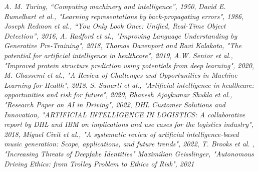 \documentclass{article}
\begin{document}
\begin{thebibliography}{9}
	 \emph{A. M. Turing, “Computing machinery and intelligence”, 1950}, 
	 \emph{David E. Rumelhart et al., "Learning representations by back-propagating errors", 1986},
	 \emph{Joseph Redmon et al., “You Only Look Once:
		Unified, Real-Time Object Detection”, 2016},
	 \emph{A. Radford et al., "Improving Language Understanding
		by Generative Pre-Training", 2018},
	 \emph{Thomas Davenport and Ravi Kalakota, "The potential for artificial intelligence in healthcare", 2019},
	 \emph{A.W. Senior et al., "Improved protein structure prediction using potentials from deep learning", 2020},
	 \emph{M. Ghassemi et al., "A Review of Challenges and Opportunities in Machine Learning for Health", 2018},
	 \emph{S. Sunarti et al., "Artificial intelligence in healthcare: opportunities and risk for future", 2020},
	 \emph{Bhavesh Ajaykumar Shukla et al., "Research Paper on AI in Driving", 2022},
	 \emph{DHL Customer Solutions and Innovation, "ARTIFICIAL INTELLIGENCE
		IN LOGISTICS: A collaborative report by DHL and IBM on implications
		and use cases for the logistics industry", 2018},
	 \emph{Miguel Civit et al., "A systematic review of artificial intelligence-based music generation: Scope, applications, and future trends", 2022},
	 \emph{T. Brooks et al. , "Increasing Threats of Deepfake Identities"}
	 \emph{Maximilian Geisslinger, "Autonomous Driving Ethics: from Trolley Problem to Ethics of Risk", 2021}
\end{thebibliography}
\end{document}
